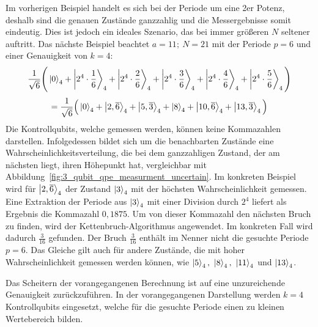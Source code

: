 Im vorherigen Beispiel handelt es sich bei der Periode um eine 2er Potenz, 
deshalb sind die genauen Zustände ganzzahlig und die Messergebnisse somit eindeutig.
Dies ist jedoch ein ideales Szenario, 
das bei immer größeren \(N\) seltener auftritt. 
Das nächste Beispiel beachtet \(a=11;~N=21\) mit der Periode \(p=6\) und einer Genauigkeit von \(k=4\):
\[\frac{1}{\sqrt{6}}
\Bigg(\ket{0}_4 +\ket{2^4 \cdot \frac{1}{6}}_4 + \ket{2^4 \cdot \frac{2}{6}}_4+
\ket{2^4 \cdot \frac{3}{6}}_4+\ket{2^4 \cdot \frac{4}{6}}_4 + \ket{2^4 \cdot \frac{5}{6}}_4
\Bigg) \]
\[= \frac{1}{\sqrt{6}}
\Big(\ket{0}_4 +\ket{2,\overline{6}}_4 + \ket{5,\overline{3}}_4+
\ket{8}_4+\ket{10,\overline{6}}_4 + \ket{13,\overline{3}}_4
\Big) \]
Die Kontrollqubits, welche gemessen werden, 
können keine Kommazahlen darstellen.
Infolgedessen bildet sich um die benachbarten Zustände eine Wahrscheinlichkeitsverteilung, 
die bei dem ganzzahligen Zustand, der am nächsten liegt, 
ihren Höhepunkt hat, vergleichbar mit Abbildung~\ref{fig:3_qubit_qpe_measurment_uncertain}.
Im konkreten Beispiel wird für \(\ket{2,\overline{6}}_4\) der Zustand \(\ket{3}_4\) 
mit der höchsten Wahrscheinlichkeit gemessen.
Eine Extraktion der Periode aus \(\ket{3}_4\) mit einer Division durch \(2^4\) liefert als Ergebnis die Kommazahl \(0,1875\).
Um von dieser Kommazahl den nächsten Bruch zu finden, wird der Kettenbruch-Algorithmus angewendet.
Im konkreten Fall wird dadurch \(\frac{3}{16}\) gefunden.
Der Bruch \(\frac{3}{16}\) enthält im Nenner nicht die gesuchte Periode \(p=6\). 
Das Gleiche gilt auch für andere Zustände, 
die mit hoher Wahrscheinlichkeit gemessen werden können, wie 
\(\ket{5}_4,~\ket{8}_4,~\ket{11}_4\) und \(\ket{13}_4\).

Das Scheitern der vorangegangenen Berechnung ist auf eine unzureichende Genauigkeit zurückzuführen. 
In der vorangegangenen Darstellung werden \(k=4\) Kontrollqubits eingesetzt, 
welche für die gesuchte Periode einen zu kleinen Wertebereich bilden.

